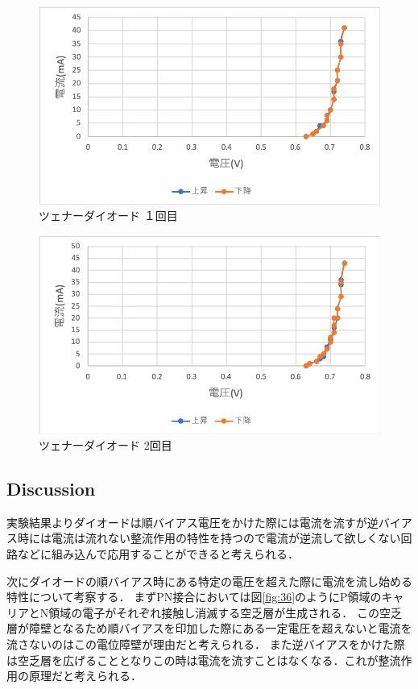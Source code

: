 \documentclass[11pt, a4paper,twocolumn]{jarticle}
\begin{document}
\newpage

\begin{figure}[htbp]
 \begin{center}
  \includegraphics[width=0.8\linewidth]{fig27.png}
 \end{center}
 \caption{ツェナーダイオード １回目}
 \label{fig:27}
\end{figure}

\begin{figure}[htbp]
 \begin{center}
  \includegraphics[width=0.8\linewidth]{fig28.png}
 \end{center}
 \caption{ツェナーダイオード 2回目}
 \label{fig:28}
\end{figure}



\subsection{Discussion}
実験結果よりダイオードは順バイアス電圧をかけた際には電流を流すが逆バイアス時には電流は流れない整流作用の特性を持つので電流が逆流して欲しくない回路などに組み込んで応用することができると考えられる．

次にダイオードの順バイアス時にある特定の電圧を超えた際に電流を流し始める特性について考察する．
まずPN接合においては図\ref{fig:36}のようにP領域のキャリアとN領域の電子がそれぞれ接触し消滅する空乏層が生成される．
この空乏層が障壁となるため順バイアスを印加した際にある一定電圧を超えないと電流を流さないのはこの電位障壁が理由だと考えられる．
また逆バイアスをかけた際は空乏層を広げることとなりこの時は電流を流すことはなくなる．これが整流作用の原理だと考えられる．
\end{document}
